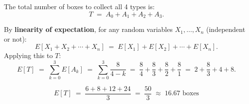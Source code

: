 \documentclass[11pt]{article}
\begin{document}
The total number of boxes to collect all 4 types is:
\[
    T \;=\; A_0 + A_1 + A_2 + A_3.
\]

By \textbf{linearity of expectation}, for any random variables $X_1, \ldots, X_n$ (independent or not):
\[
    E[X_1 + X_2 + \cdots + X_n] \;=\; E[X_1] + E[X_2] + \cdots + E[X_n].
\]
Applying this to $T$:
\[
    E[T] \;=\; \sum_{k=0}^{3} E[A_k] \;=\; \sum_{k=0}^{3} \frac{8}{4-k} \;=\; \frac{8}{4} + \frac{8}{3} + \frac{8}{2} + \frac{8}{1} \;=\; 2 + \frac{8}{3} + 4 + 8.
\]

\[
    \boxed{\; E[T] \;=\; \frac{6 + 8 + 12 + 24}{3} \;=\; \frac{50}{3} \;\approx\; 16.67 \text{ boxes} \;}
\]
\end{document}
